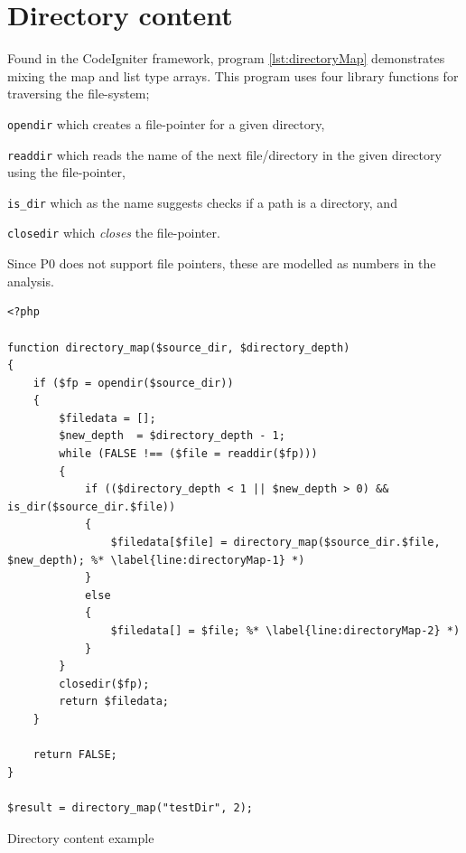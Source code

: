 \section{Directory content}
\label{sec:directoryContent}
Found in the CodeIgniter framework, program \ref{lst:directoryMap} demonstrates mixing the map and list type arrays. This program uses four library functions for traversing the file-system; \begin{enumerate*}[label=\itshape\roman*\upshape)]
\item \texttt{opendir} which creates a file-pointer for a given directory,
\item \texttt{readdir} which reads the name of the next file/directory in the given directory using the file-pointer,
\item \texttt{is\_dir} which as the name suggests checks if a path is a directory, and
\item \texttt{closedir} which \emph{closes} the file-pointer.
\end{enumerate*} Since P0 does not support file pointers, these are modelled as numbers in the analysis. 


\begin{program}
\begin{lstlisting}
<?php

function directory_map($source_dir, $directory_depth)
{
    if ($fp = opendir($source_dir))
    {
        $filedata = [];
        $new_depth	= $directory_depth - 1;
        while (FALSE !== ($file = readdir($fp)))
        {
            if (($directory_depth < 1 || $new_depth > 0) && is_dir($source_dir.$file))
            {
                $filedata[$file] = directory_map($source_dir.$file, $new_depth); %* \label{line:directoryMap-1} *)
            }
            else
            {
                $filedata[] = $file; %* \label{line:directoryMap-2} *)
            }
        }
        closedir($fp);
        return $filedata;
    }

    return FALSE;
}

$result = directory_map("testDir", 2);
\end{lstlisting}
\caption{Directory content example}
\label{lst:directoryMap}
\end{program}


